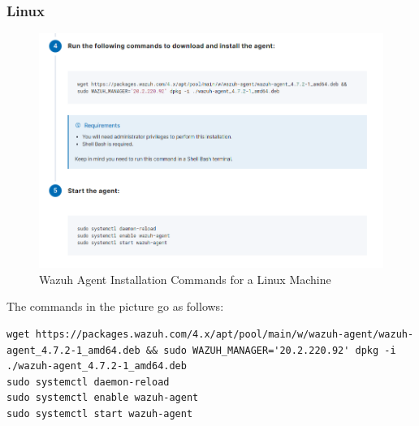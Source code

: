 \begin{itemize}
  \subsubsection{Linux}
    \begin{figure}[H]
      \centering
      \includegraphics[width=\textwidth]{images/setup/wazuh-agent-commands-linux.png}
      \caption{Wazuh Agent Installation Commands for a Linux Machine}
    \end{figure}
    The commands in the picture go as follows:
    \begin{verbatim}
wget https://packages.wazuh.com/4.x/apt/pool/main/w/wazuh-agent/wazuh-agent_4.7.2-1_amd64.deb && sudo WAZUH_MANAGER='20.2.220.92' dpkg -i ./wazuh-agent_4.7.2-1_amd64.deb
sudo systemctl daemon-reload
sudo systemctl enable wazuh-agent
sudo systemctl start wazuh-agent
    \end{verbatim}


\end{itemize}
